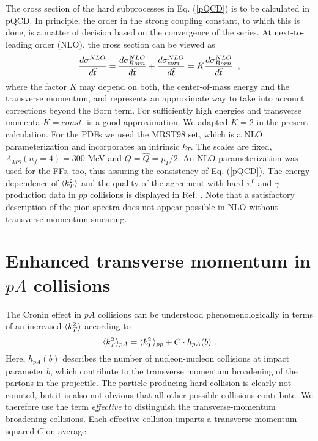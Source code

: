 The cross section of the hard subprocesses in Eq. (\ref{pQCD}) is to be 
calculated in pQCD. In principle, the order in the strong 
coupling constant, to which this is done, is a matter of decision based 
on the convergence of the series. At next-to-leading order
(NLO), the cross section can be viewed as 
\begin{equation}
\label{Kdef}
\frac{d\sigma^{NLO}}{d\hat{t}} = \frac{d\sigma^{NLO}_{Born}}{d\hat{t}} +
   \frac{d\sigma^{NLO}_{corr}}{d\hat{t}} = K  \frac{d\sigma^{NLO}_{Born}}{d\hat{t}}
\;\;  \, \\,
\end{equation}    
where the factor $K$ may depend on both, the center-of-mass energy
and the transverse momentum, and represents an approximate way
to take into account corrections beyond the Born term. 
For sufficiently high energies and transverse momenta $K=const.$ is a good
approximation\cite{wong98}. We adapted $K=2$ in the present 
calculation. For the PDFs we used the MRST98 set\cite{MRST98}, which
is a NLO parameterization and incorporates an intrinsic $k_T$. The scales are 
fixed, $\Lambda_{\overline {MS}}(n_f=4) = 300$ MeV and $Q=\widehat{Q}=p_T/2$. 
An NLO parameterization was used for the FFs, too\cite{BKK}, thus 
assuring the consistency of Eq. (\ref{pQCD}). The energy dependence of
$\k2av$ and the quality of the agreement with hard $\pi^0$ and $\gamma$
production data in $pp$ collisions is displayed in Ref. \cite{plf00}.
Note that a satisfactory description of the pion spectra does not 
appear possible in NLO without transverse-momentum smearing\cite{Narancs}.  

\section{Enhanced transverse momentum in $pA$ collisions}

The Cronin effect in $pA$ collisions can be understood
phenomenologically\cite{wang9798}
in terms of an increased $\k2av$ according to 
\begin{equation}
\label{ktbroadpA}
\langle k_T^2\rangle_{pA} = \langle k_T^2\rangle_{pp} + C \cdot h_{pA}(b) \ . 
\end{equation}
Here, $h_{pA}(b)$ describes the number of 
nucleon-nucleon collisions at impact parameter $b$,
which contribute to the transverse momentum broadening of the
partons in the projectile. The particle-producing hard 
collision is clearly not counted, but it is also not obvious that
all other possible collisions contribute. We therefore use the term
{\it effective} to distinguish the transverse-momentum 
broadening collisions. Each  effective collision imparts
a transverse momentum squared $C$ on average. 

